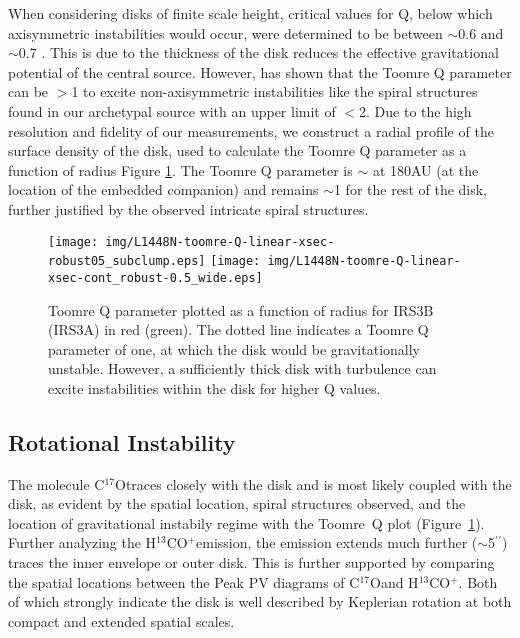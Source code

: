 \documentclass[preprint,12pt]{aastex62}
\newcommand{\cso}{C$^{17}$O}
\newcommand{\htcop}{H$^{13}$CO$^+$}
\renewcommand{\arcsec}{$^{\prime\prime}$}
\newcommand{\ab}{$\sim$}
\begin{document}
When considering disks of finite scale height, critical values for Q, below which axisymmetric instabilities would occur, were determined to be between \ab0.6 and \ab0.7 \citep{2007ApJ...660.1232K,2015MNRAS.448.1007B}. This is due to the thickness of the disk reduces the effective gravitational potential of the central source. However, \citet{2008gady.book.....B} has shown that the Toomre Q parameter can be $>$1 to excite non-axisymmetric instabilities like the spiral structures found in our archetypal source with an upper limit of $<$2. Due to the high resolution and fidelity of our measurements, we construct a radial profile of the surface density of the disk, used to calculate the Toomre Q parameter as a function of radius Figure \ref{fig:toomreq}. The Toomre Q parameter is \ab{} at 180AU (at the location of the embedded companion) and remains \ab1 for the rest of the disk, further justified by the observed intricate spiral structures.

\begin{figure}[H]
\begin{center}
\texttt{[image: img/L1448N-toomre-Q-linear-xsec-robust05\_subclump.eps]}
\texttt{[image: img/L1448N-toomre-Q-linear-xsec-cont\_robust-0.5\_wide.eps]}
\end{center}   
\caption{Toomre Q parameter plotted as a function of radius for IRS3B (IRS3A) in red (green). The dotted line indicates a Toomre Q parameter of one, at which the disk would be gravitationally unstable. However, a sufficiently thick disk with turbulence can excite instabilities within the disk for higher Q values.}\label{fig:toomreq}
\end{figure}

\subsection{Rotational Instability}
The molecule \cso\space traces closely with the disk and is most likely coupled with the disk, as evident by the spatial location, spiral structures observed, and the location of gravitational instabily regime with the Toomre~Q plot (Figure~\ref{fig:toomreq}). Further analyzing the \htcop\space emission, the emission extends much further (\ab5\arcsec) traces the inner envelope or outer disk. This is further supported by comparing the spatial locations between the Peak PV diagrams of \cso\space and \htcop. Both of which strongly indicate the disk is well described by Keplerian rotation at both compact and extended spatial scales. 
\end{document}
